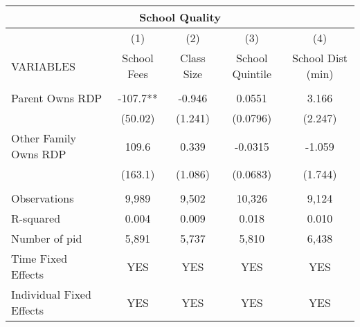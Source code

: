 \begin{tabular}{lcccc}
\multicolumn{5}{c}{School Quality} \\ \hline
 & (1) & (2) & (3) & (4) \\
VARIABLES & School Fees & Class Size & School Quintile & School Dist (min) \\ \hline
 &  &  &  &  \\
Parent Owns RDP & -107.7** & -0.946 & 0.0551 & 3.166 \\
 & (50.02) & (1.241) & (0.0796) & (2.247) \\
Other Family Owns RDP & 109.6 & 0.339 & -0.0315 & -1.059 \\
 & (163.1) & (1.086) & (0.0683) & (1.744) \\
 &  &  &  &  \\
Observations & 9,989 & 9,502 & 10,326 & 9,124 \\
R-squared & 0.004 & 0.009 & 0.018 & 0.010 \\
Number of pid & 5,891 & 5,737 & 5,810 & 6,438 \\
Time Fixed Effects & YES & YES & YES & YES \\
 Individual Fixed Effects & YES & YES & YES & YES \\ \hline
\end{tabular}
